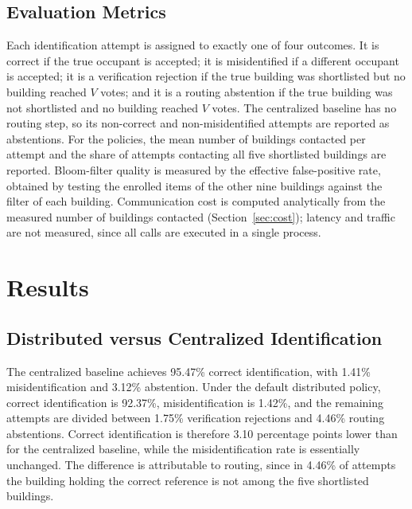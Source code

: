 \documentclass[pdflatex,sn-mathphys-num]{sn-jnl}%
\theoremstyle{thmstyleone}%
\theoremstyle{thmstyletwo}%
\theoremstyle{thmstylethree}%
\begin{document}
\subsection{Evaluation Metrics}

Each identification attempt is assigned to exactly one of four outcomes. It is correct if the true occupant is accepted; it is misidentified if a different occupant is accepted; it is a verification rejection if the true building was shortlisted but no building reached $V$ votes; and it is a routing abstention if the true building was not shortlisted and no building reached $V$ votes. The centralized baseline has no routing step, so its non-correct and non-misidentified attempts are reported as abstentions. For the policies, the mean number of buildings contacted per attempt and the share of attempts contacting all five shortlisted buildings are reported. Bloom-filter quality is measured by the effective false-positive rate, obtained by testing the enrolled items of the other nine buildings against the filter of each building. Communication cost is computed analytically from the measured number of buildings contacted (Section~\ref{sec:cost}); latency and traffic are not measured, since all calls are executed in a single process.


\section{Results}
\label{sec:results}

\subsection{Distributed versus Centralized Identification}

The centralized baseline achieves 95.47\% correct identification, with 1.41\% misidentification and 3.12\% abstention. Under the default distributed policy, correct identification is 92.37\%, misidentification is 1.42\%, and the remaining attempts are divided between 1.75\% verification rejections and 4.46\% routing abstentions. Correct identification is therefore 3.10 percentage points lower than for the centralized baseline, while the misidentification rate is essentially unchanged. The difference is attributable to routing, since in 4.46\% of attempts the building holding the correct reference is not among the five shortlisted buildings.
\end{document}

